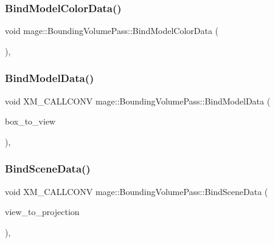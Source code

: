 \subsubsection{\texorpdfstring{Bind\+Model\+Color\+Data()}{BindModelColorData()}}
{\footnotesize\ttfamily void mage\+::\+Bounding\+Volume\+Pass\+::\+Bind\+Model\+Color\+Data (\begin{DoxyParamCaption}{ }\end{DoxyParamCaption})\hspace{0.3cm}{\ttfamily [private]}, {\ttfamily [noexcept]}}

\hypertarget{classmage_1_1_bounding_volume_pass_a8066f125ce3989be18f5c0392c65a228}{}\label{classmage_1_1_bounding_volume_pass_a8066f125ce3989be18f5c0392c65a228} 
\subsubsection{\texorpdfstring{Bind\+Model\+Data()}{BindModelData()}}
{\footnotesize\ttfamily void X\+M\+\_\+\+C\+A\+L\+L\+C\+O\+NV mage\+::\+Bounding\+Volume\+Pass\+::\+Bind\+Model\+Data (\begin{DoxyParamCaption}\item[{F\+X\+M\+M\+A\+T\+R\+IX}]{box\+\_\+to\+\_\+view }\end{DoxyParamCaption})\hspace{0.3cm}{\ttfamily [private]}, {\ttfamily [noexcept]}}

\hypertarget{classmage_1_1_bounding_volume_pass_aba0dea2c91840728e46c6bc277595b64}{}\label{classmage_1_1_bounding_volume_pass_aba0dea2c91840728e46c6bc277595b64} 
\subsubsection{\texorpdfstring{Bind\+Scene\+Data()}{BindSceneData()}}
{\footnotesize\ttfamily void X\+M\+\_\+\+C\+A\+L\+L\+C\+O\+NV mage\+::\+Bounding\+Volume\+Pass\+::\+Bind\+Scene\+Data (\begin{DoxyParamCaption}\item[{F\+X\+M\+M\+A\+T\+R\+IX}]{view\+\_\+to\+\_\+projection }\end{DoxyParamCaption})\hspace{0.3cm}{\ttfamily [private]}, {\ttfamily [noexcept]}}

